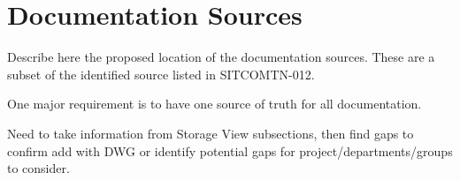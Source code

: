 \section{Documentation Sources}
\label{sec:primary-sources}

Describe here the proposed location of the documentation sources.  
These are a subset of the identified source listed in SITCOMTN-012.

One major requirement is to have one source of truth for all documentation. 

Need to take information from Storage View subsections, then find gaps to confirm add with DWG or identify potential gaps for project/departments/groups to consider.

